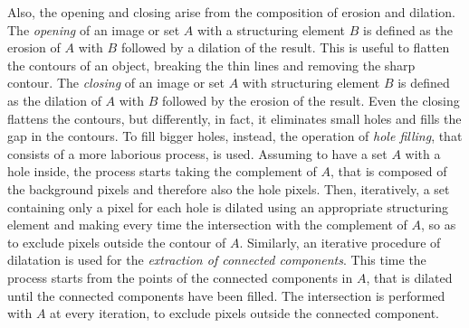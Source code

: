 \documentclass[final,a4paper,12pt,english]{UnicaPhdThesis3}
\begin{document}
Also, the opening and closing arise from the composition of erosion and dilation. The \textit{opening} of an image or set $A$ with a structuring element $B$ is defined as the erosion of $A$ with $B$ followed by a dilation of the result. This is useful to flatten the contours of an object, breaking the thin lines and removing the sharp contour. The \textit{closing} of an image or set $A$ with structuring element $B$ is defined as the dilation of $A$ with $B$ followed by the erosion of the result. Even the closing flattens the contours, but differently, in fact, it eliminates small holes and fills the gap in the contours. To fill bigger holes, instead, the operation of \textit{hole filling}, that consists of a more laborious process, is used. Assuming to have a set $A$ with a hole inside, the process starts taking the complement of $A$, that is composed of the background pixels and therefore also the hole pixels. Then, iteratively, a set containing only a pixel for each hole is dilated using an appropriate structuring element and making every time the intersection with the complement of $A$, so as to exclude pixels outside the contour of $A$.
Similarly, an iterative procedure of dilatation is used for the \textit{extraction of connected components}. This time the process starts from the points of the connected components in $A$, that is dilated until the connected components have been filled. The intersection is performed with $A$ at every iteration, to exclude pixels outside the connected component. 
\end{document}
